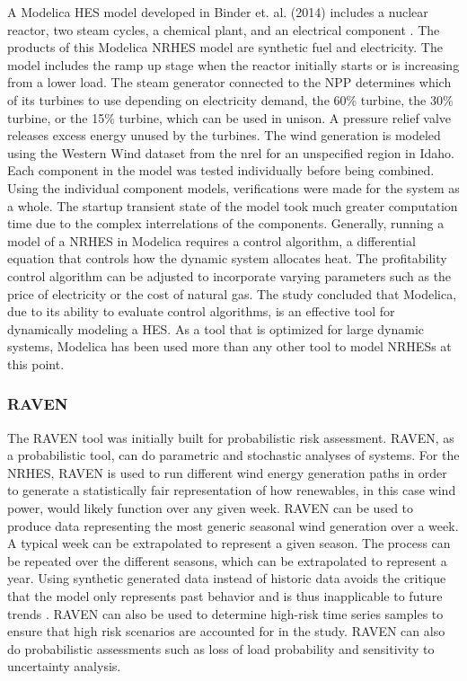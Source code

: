 \documentclass[12pt]{UIdahoMastersThesis}
\begin{document}
A Modelica HES model developed in Binder et. al. (2014) includes a nuclear reactor, two steam cycles, a chemical plant, and an electrical component \cite{Binder2014}. The products of this Modelica NRHES model are synthetic fuel and electricity. The model includes the ramp up stage when the reactor initially starts or is increasing from a lower load. The steam generator connected to the NPP determines which of its turbines to use depending on electricity demand, the 60\% turbine, the 30\% turbine, or the 15\% turbine, which can be used in unison. A pressure relief valve releases excess energy unused by the turbines. The wind generation is modeled using the Western Wind dataset from the \ac{nrel} for an unspecified region in Idaho. Each component in the model was tested individually before being combined. Using the individual component models, verifications were made for the system as a whole. The startup transient state of the model took much greater computation time due to the complex interrelations of the components. Generally, running a model of a NRHES in Modelica requires a control algorithm, a differential equation that controls how the dynamic system allocates heat. The profitability control algorithm can be adjusted to incorporate varying parameters such as the price of electricity or the cost of natural gas. The study concluded that Modelica, due to its ability to evaluate control algorithms, is an effective tool for dynamically modeling a HES. As a tool that is optimized for large dynamic systems, Modelica has been used more than any other tool to model NRHESs at this point.  

\subsubsection{RAVEN}
The RAVEN tool was initially built for probabilistic risk assessment. RAVEN, as a probabilistic tool, can do parametric and stochastic analyses of systems\cite{RabitiRAVEN}. For the NRHES, RAVEN is used to run different wind energy generation paths in order to generate a statistically fair representation of how renewables, in this case wind power, would likely function over any given week. RAVEN can be used to produce data representing the most generic seasonal wind generation over a week. A typical week can be extrapolated to represent a given season. The process can be repeated over the different seasons, which can be extrapolated to represent a year. Using synthetic generated data instead of historic data avoids the critique that the model only represents past behavior and is thus inapplicable to future trends \cite{redfoot_epiney_2016}. RAVEN can also be used to determine high-risk time series samples to ensure that high risk scenarios are accounted for in the study. RAVEN can also do probabilistic assessments such as loss of load probability and sensitivity to uncertainty analysis. 
\end{document}
